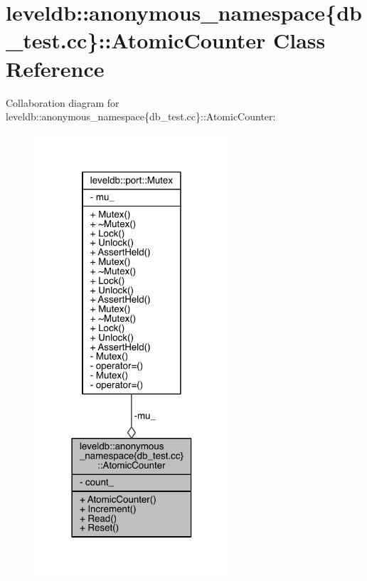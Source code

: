 \hypertarget{classleveldb_1_1anonymous__namespace_02db__test_8cc_03_1_1_atomic_counter}{}\section{leveldb\+:\+:anonymous\+\_\+namespace\{db\+\_\+test.\+cc\}\+:\+:Atomic\+Counter Class Reference}
\label{classleveldb_1_1anonymous__namespace_02db__test_8cc_03_1_1_atomic_counter}


Collaboration diagram for leveldb\+:\+:anonymous\+\_\+namespace\{db\+\_\+test.\+cc\}\+:\+:Atomic\+Counter\+:
\nopagebreak
\begin{figure}[H]
\begin{center}
\leavevmode
\includegraphics[width=206pt]{classleveldb_1_1anonymous__namespace_02db__test_8cc_03_1_1_atomic_counter__coll__graph}
\end{center}
\end{figure}
